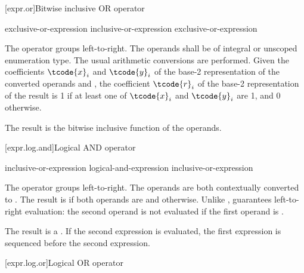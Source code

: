 [expr.or]{Bitwise inclusive OR operator}%
%
%

\begin{bnf}
\br
    exclusive-or-expression\br
    inclusive-or-expression \terminal{|} exclusive-or-expression
\end{bnf}

\pnum
The \tcode{|} operator groups left-to-right.
The operands shall be of integral or unscoped enumeration type.
The usual arithmetic conversions are performed.
Given the coefficients $\tcode{x}_i$ and $\tcode{y}_i$
of the base-2 representation
of the converted operands  and ,
the coefficient $\tcode{r}_i$
of the base-2 representation of the result 
is 1 if at least one of $\tcode{x}_i$ and $\tcode{y}_i$ are 1, and 0 otherwise.
\begin{note}
The result is the bitwise inclusive  function of the operands.
\end{note}

[expr.log.and]{Logical AND operator}%
%
%
%

\begin{bnf}
\br
    inclusive-or-expression\br
    logical-and-expression \terminal{\&\&} inclusive-or-expression
\end{bnf}

\pnum
The \tcode{\&\&} operator groups left-to-right. The operands are both
contextually converted to .
The
result is  if both operands are  and
 otherwise. Unlike \tcode{\&}, \tcode{\&\&} guarantees
left-to-right evaluation: the second operand is not evaluated if the
first operand is .

\pnum
The result is a .
%
If the second expression is evaluated,
the first expression is sequenced before
the second expression.

[expr.log.or]{Logical OR operator}%
%
%
%

